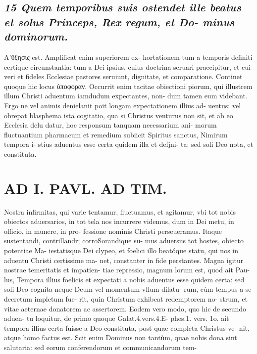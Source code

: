 \documentclass{article}
\begin{document}
\begin{pages}
\subsection*{\textit{15 Quem temporibus suis ostendet ille beatus et solus Princeps, Rex regum, et Do- minus dominorum. }}\pstart Α'ὔξησις est. Amplificat enim superiorem ex- hortationem tum a temporis definiti certique circunstantia: tum a Dei ipsius, cuius doctrina seruari praecipitur, et cui veri et fideles Ecclesiae pastores seruiunt, dignitate, et comparatione. Continet quoque hic locus ύποφοραν. Occurrit enim tacitae obiectioni piorum, qui illustrem illum Christi aduentum iamdudum expectantes, non- dum tamen eum videbant. Ergo ne vel animis denielanit poit longam expectationem illius ad- uentus: vel obrepat blasphema ista cogitatio, qua si Christus venturus non sit, et ab eo Ecclesia delu datur, hoc responsum tanquam necessarium ani- morum fluctuantium pharmacum et remedium subiicit Spiritus sanctus, Nimirum tempora i- stius aduentus esse certa quidem illa et defjni- ta: sed soli Deo nota, et constituta.  \pend
\section*{AD I. PAVL. AD TIM. }
\marginpar{[ p.110 ]} Nostra infirmitas, qui varie tentamur, fluctuamus, et agitamur, vbi tot nobis obiectos aduersarios, in tot tela nos incurrere videmus, dum in Dei metu, in officio, in munere, in pro- fessione nominis Christi perseueramus. Itaque sustentandi, contrillandr; corroSorandique su- mus aduersus tot hostes, obiecto potentiae Ma- iestatisque Dei clypeo, et foelici illo beatóque statu, qui nos in aduentu Christi certissime ma- net, constanter in fide perstantes.  \pend\pstart Magna igitur nostrae temeritatis et impatien- tiae repressio, magnum lorum est, quod ait Pau- lus, Tempora illius foelicis et expectati a nobis aduentus esse quidem certa: sed soli Deo cognita neque Deum vel momentum vllum dilatu- rum, cùm tempus a se decretum impletum fue- rit, quin Christum exhibeat redemptorem no- strum, et vitae aeternae donatorem ac assertorem. Eodem vero modo, quo hic de secundo aduen- tu loquitur, de primo quoque Galat.4.vers.4.E- phes.1. vers. 1o. ait tempora illius certa fuisse a Deo constituta, post quae completa Christus ve- nit, atque homo factus est. Scit enim Dominus non tantùm, quae nobis dona sint salutaria: sed eorum conferendorum et communicandorum tem-  \pend

\end{pages}
\end{document}
